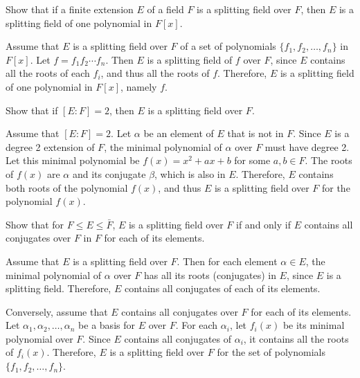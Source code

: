 
\begin{problem}[44.23]
  Show that if a finite extension $E$ of a field $F$ is a splitting field over $F$, then $E$ is a splitting field of one polynomial in $F[x]$.
\end{problem}

\begin{solution}
  Assume that $E$ is a splitting field over $F$ of a set of polynomials $\{f_1, f_2, \dots, f_n\}$ in $F[x]$. Let $f = f_1 f_2 \cdots f_n$. Then $E$ is a splitting field of $f$ over $F$, since $E$ contains all the roots of each $f_i$, and thus all the roots of $f$. Therefore, $E$ is a splitting field of one polynomial in $F[x]$, namely $f$.
\end{solution}

\begin{problem}[44.24]
  Show that if $[E : F] = 2$, then $E$ is a splitting field over $F$.
\end{problem}

\begin{solution}
  Assume that $[E : F] = 2$. Let $\alpha$ be an element of $E$ that is not in $F$. Since $E$ is a degree 2 extension of $F$, the minimal polynomial of $\alpha$ over $F$ must have degree 2. Let this minimal polynomial be $f(x) = x^2 + ax + b$ for some $a, b \in F$. The roots of $f(x)$ are $\alpha$ and its conjugate $\beta$, which is also in $E$. Therefore, $E$ contains both roots of the polynomial $f(x)$, and thus $E$ is a splitting field over $F$ for the polynomial $f(x)$.
\end{solution}

\begin{problem}[44.25]
  Show that for $F \le E \le \bar{F}$, $E$ is a splitting field over $F$ if and only if $E$ contains all conjugates over $F$ in $F$ for each of its elements.
\end{problem}

\begin{solution}
  Assume that $E$ is a splitting field over $F$. Then for each element $\alpha \in E$, the minimal polynomial of $\alpha$ over $F$ has all its roots (conjugates) in $E$, since $E$ is a splitting field. Therefore, $E$ contains all conjugates of each of its elements.

  Conversely, assume that $E$ contains all conjugates over $F$ for each of its elements. Let $\alpha_1, \alpha_2, \dots, \alpha_n$ be a basis for $E$ over $F$. For each $\alpha_i$, let $f_i(x)$ be its minimal polynomial over $F$. Since $E$ contains all conjugates of $\alpha_i$, it contains all the roots of $f_i(x)$. Therefore, $E$ is a splitting field over $F$ for the set of polynomials $\{f_1, f_2, \dots, f_n\}$.
\end{solution}

